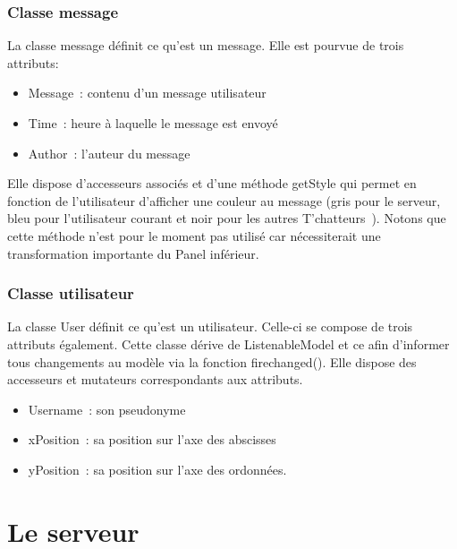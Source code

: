 \documentclass[a4paper,12pt]{report}
\begin{document}
      \subsection{Classe message}
        La classe message définit ce qu’est un message. Elle est pourvue de trois attributs:
        \begin{itemize}
          \item Message : contenu d’un message utilisateur
          \item Time : heure à laquelle le message est envoyé
          \item Author : l’auteur du message
        \end{itemize}
        \bigbreak
        Elle dispose d’accesseurs associés et d’une méthode getStyle qui permet en fonction de l’utilisateur d’afficher une couleur au message (gris pour le serveur, bleu pour l’utilisateur courant et noir pour les autres T’chatteurs ). Notons que cette méthode n'est pour le moment pas utilisé car nécessiterait une transformation importante du Panel inférieur.

      \subsection{Classe utilisateur}
        La classe User définit ce qu’est un utilisateur. Celle-ci se compose de trois attributs également. Cette classe dérive de ListenableModel et ce afin d’informer tous changements au modèle via la fonction firechanged(). Elle dispose des accesseurs et mutateurs correspondants aux attributs.
        \begin{itemize}
          \item Username : son pseudonyme
          \item xPosition : sa position sur l’axe des abscisses
          \item yPosition : sa position sur l’axe des ordonnées.
        \end{itemize}

  \chapter{Le serveur}
\end{document}
